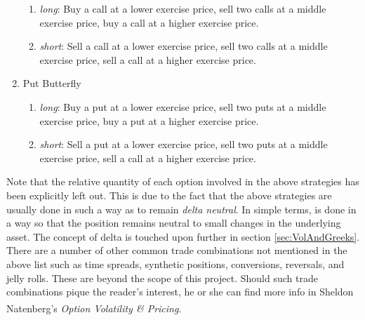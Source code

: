 \documentclass[12pt, a4paper, notitlepage]{article}
\numberwithin{equation}{subsection}
\numberwithin{figure}{subsection}
\numberwithin{table}{subsection}
\newcommand{\newpar}{\newline \newline}
\begin{document}
\begin{enumerate}
\begin{enumerate}
    		\item \textit{long}:  Buy a call at a lower exercise price, sell two calls at a middle exercise price, buy a call at a higher exercise price.
            \item \textit{short}:  Sell a call at a lower exercise price, sell two calls at a middle exercise price, sell a call at a higher exercise price.
    	\end{enumerate}
    \item Put Butterfly
    	\begin{enumerate}
    		\item \textit{long}:  Buy a put at a lower exercise price, sell two puts at a middle exercise price, buy a put at a higher exercise price.
            \item \textit{short}:  Sell a put at a lower exercise price, sell two puts at a middle exercise price, sell a call at a higher exercise price.
    	\end{enumerate}
\end{enumerate}
Note that the relative quantity of each option involved in the above strategies has been explicitly left out.  This is due to the fact that the above strategies are usually done in such a way as to remain \textit{delta neutral}.  In simple terms, is done in a way so that the position remains neutral to small changes in the underlying asset.  The concept of delta is touched upon further in section \ref{sec:VolAndGreeks}.
\newpar
There are a number of other common trade combinations not mentioned in the above list such as time spreads, synthetic positions, conversions, reversals, and jelly rolls.  These are beyond the scope of this project.  Should such trade combinations pique the reader's interest, he or she can find more info in Sheldon Natenberg's \textit{Option Volatility \& Pricing}\textsuperscript{\cite{Natenberg}}.
\end{document}
